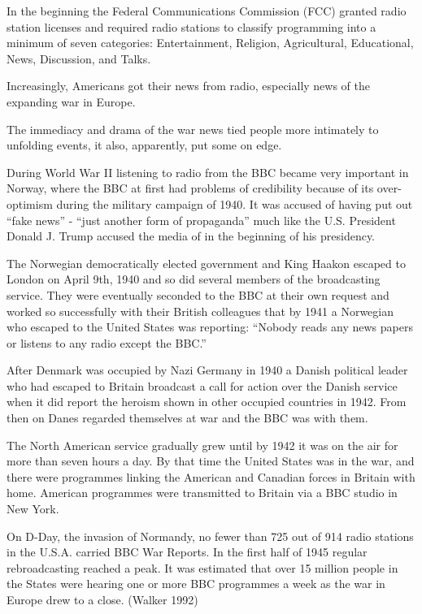 \documentclass[a4paper,norsk,utf8]{report}
\begin{document}
    In the beginning the Federal Communications Commission (FCC)
    granted radio station licenses and required radio stations to
    classify programming into a minimum of seven categories:
    Entertainment, Religion, Agricultural, Educational, News,
    Discussion, and Talks.

    Increasingly, Americans got their news from radio, especially news
    of the expanding war in Europe.

    The immediacy and drama of the war news tied people more intimately
    to unfolding events, it also, apparently, put some on edge.

    During World War II listening to radio from the BBC became very
    important in Norway, where the BBC at first had problems of
    credibility because of its over-optimism during the military
    campaign of 1940.  It was accused of having put out ``fake news''
    - ``just another form of propaganda'' much like the U.S. President
    Donald J. Trump accused the media of in the beginning of his presidency.

    The Norwegian democratically elected government and King Haakon
    escaped to London on April 9th, 1940 and so did several members of
    the broadcasting service.  They were eventually seconded to the
    BBC at their own request and worked so successfully with their
    British colleagues that by 1941 a Norwegian who escaped to the
    United States was reporting: ``Nobody reads any news papers or
    listens to any radio except the BBC.''

    After Denmark was occupied by Nazi Germany in 1940 a Danish political 
    leader who had escaped to Britain broadcast a call for action over the 
    Danish service when it did report the heroism shown in other occupied 
    countries in 1942.   From then on Danes regarded themselves at war and
    the BBC was with them.

    The North American service gradually grew until by 1942 it was on
    the air for more than seven hours a day.  By that time the United
    States was in the war, and there were programmes linking the
    American and Canadian forces in Britain with home.  American
    programmes were transmitted to Britain via a BBC studio in New
    York.

    On D-Day, the invasion of Normandy, no fewer than 725 out of 914
    radio stations in the U.S.A. carried BBC War Reports.  In the first
    half of 1945 regular rebroadcasting reached a peak.  It was
    estimated that over 15 million people in the States were hearing
    one or more BBC programmes a week as the war in Europe drew to a
    close. (Walker 1992)
\end{document}
